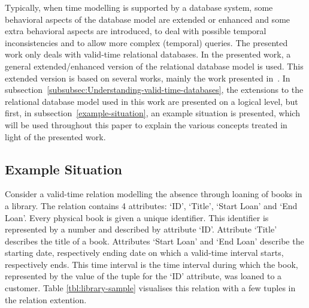 Typically, when time modelling is supported by a database system, some behavioral aspects of the database model are extended or enhanced and some extra behavioral aspects are introduced, to deal with possible temporal inconsistencies and to allow more complex (temporal) queries. The presented work only deals with valid-time relational databases. In the presented work, a general extended/enhanced version of the relational database model is used. This extended version is based on several works, mainly the work presented in~\cite{Jensen1994}. In subsection~\ref{subsubsec:Understanding-valid-time-databases}, the extensions to the relational database model used in this work are presented on a logical level, but first, in subsection~\ref{example-situation}, an example situation is presented, which will be used throughout this paper to explain the various concepts treated in light of the presented work.



\subsection{\label{example-situation}Example Situation}
Consider a valid-time relation modelling the absence through loaning of books in a library. The relation contains 4 attributes: `ID', `Title', `Start Loan' and `End Loan'. Every physical book is given a unique identifier. This identifier is represented by a number and described by attribute `ID'. Attribute `Title' describes the title of a book. Attributes `Start Loan' and `End Loan' describe the starting date, respectively ending date on which a valid-time interval starts, respectively ends. This time interval is the time interval during which the book, represented by the value of the tuple for the `ID' attribute, was loaned to a customer. Table \ref{tbl:library-sample} visualises this relation with a few tuples in the relation extention.

